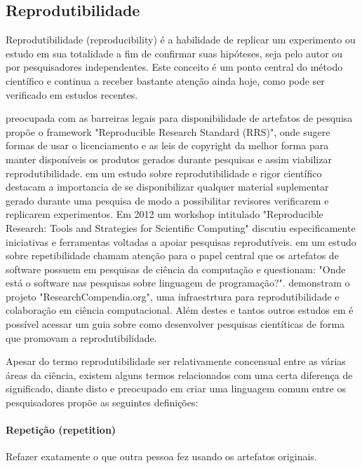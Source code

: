 \documentclass[12pt]{article}
\begin{document}
\subsection{Reprodutibilidade}

Reprodutibilidade (reproducibility) é a habilidade de replicar um experimento
ou estudo em sua totalidade a fim de confirmar suas hipóteses, seja pelo
autor ou por pesquisadores independentes. Este conceito é um ponto
central do método científico e continua a receber bastante atenção ainda hoje,
como pode ser verificado em estudos recentes.

 preocupada com as barreiras legais para
disponibilidade de artefatos de pesquisa propõe o framework "Reproducible
Research Standard (RRS)", onde sugere formas de usar o licenciamento e as leis
de copyright da melhor forma para manter disponíveis os produtos gerados
durante pesquisas e assim viabilizar reprodutibilidade. 
em um estudo sobre reprodutibilidade e rigor científico destacam a importancia
de se disponibilizar qualquer material suplementar gerado durante uma pesquisa
de modo a possibilitar revisores verificarem e replicarem experimentos. Em
2012 um workshop intitulado "Reproducible Research: Tools and Strategies for
Scientific Computing" \cite{Stodden2012} discutiu especificamente iniciativas
e ferramentas voltadas a apoiar pesquisas reprodutíveis.
 em um estudo sobre repetibilidade chamam
atenção para o papel central que os artefatos de software possuem em pesquisas
de ciência da computação e questionam: "Onde está o software nas pesquisas
sobre linguagem de programação?".  demonstram o
projeto "ResearchCompendia.org", uma infraestrtura para reprodutibilidade e
colaboração em ciência computacional. Além destes e tantos outros estudos em
\cite{GithubReproducibilityGuide} é possível acessar um guia sobre como
desenvolver pesquisas cientíticas de forma que promovam a reprodutibilidade.

Apesar do termo reprodutibilidade ser relativamente concensual entre as várias
áreas da ciência, existem alguns termos relacionados com uma certa diferença
de significado, diante disto e preocupado em criar uma linguagem comum entre
os pesquisadores  propõe as seguintes definições:

\paragraph{Repetição (repetition)}
Refazer exatamente o que outra pessoa fez usando os artefatos originais.
\end{document}
